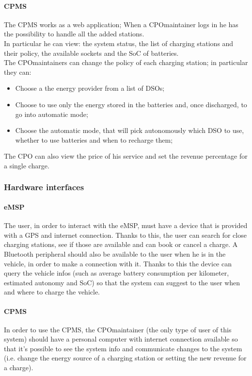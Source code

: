 \paragraph{\ac{CPMS}}
The \ac{CPMS} works as a web application; When a \ac{CPO}maintainer logs in he has the possibility to handle all the added stations.\\
In particular he can view: the system status, the list of charging stations and their policy, the available sockets and the \ac{SoC} of batteries.\\
The \ac{CPO}maintainers can change the policy of each charging station; in particular they can:
\begin{itemize}
    \item Choose a the energy provider from a list of \acp{DSO};
    \item Choose to use only the energy stored in the batteries and, once discharged, to go into automatic mode;
    \item Choose the automatic mode, that will pick autonomously which \ac{DSO} to use, whether to use batteries and when to recharge them;
\end{itemize}

The \ac{CPO} can also view the price of his service and set the revenue percentage for a single charge.

\subsubsection{Hardware interfaces}
\paragraph{\ac{eMSP}}
The user, in order to interact with the \ac{eMSP}, must have a device that is provided with a \ac{GPS} and internet connection. Thanks to this, the user can search for close charging stations, see if those are available and can book or cancel a charge.
A Bluetooth peripheral should also be available to the user when he is in the vehicle, in order to make a connection with it. Thanks to this the device can query the vehicle infos (such as average battery consumption per kilometer, estimated autonomy and \ac{SoC}) so that the system can suggest to the user when and where to charge the vehicle.

\paragraph{\ac{CPMS}}
In order to use the \ac{CPMS}, the \ac{CPO}maintainer (the only type of user of this system) should have a personal computer with internet connection available so that it's possible to see the system info and communicate changes to the system (i.e. change the energy source of a charging station or setting the new revenue for a charge).

